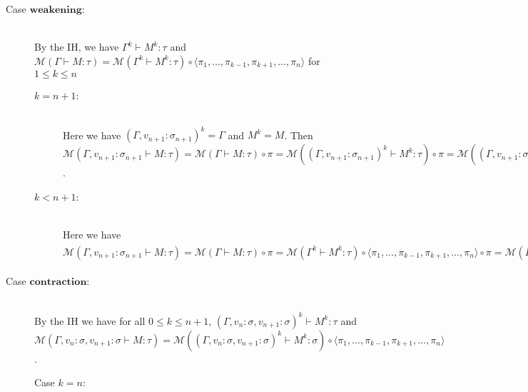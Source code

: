\documentclass{article}
\newcommand{\mbf}{\mathbf}
\begin{document}
\begin{description}
\item[Case $\mbf{weakening}$:]~\\

By the IH, we have $\Gamma^k \vdash M^k : \tau$ and 
$\mathcal M(\Gamma \vdash M : \tau) = \mathcal M(\Gamma^k \vdash M^k : \tau) \circ \langle \pi_1, \ldots, \pi_{k-1},\pi_{k+1},\ldots,\pi_n \rangle$ for $1 \leq k \leq n$

\begin{description}

\item[$k = n+1$:]~\\
Here we have $(\Gamma,v_{n+1}:\sigma_{n+1})^k = \Gamma$ and $M^k = M$.
Then $\mathcal M(\Gamma,v_{n+1} : \sigma_{n+1} \vdash M : \tau) = \mathcal M(\Gamma \vdash M : \tau) \circ \pi
= \mathcal M((\Gamma,v_{n+1}:\sigma_{n+1})^k \vdash M^k : \tau) \circ \pi 
= \mathcal M((\Gamma,v_{n+1}:\sigma_{n+1})^k \vdash M^k : \tau) \circ \langle \pi_1, \ldots, \pi_{k-1} (= \pi_{n}) \rangle$.

\item[$k < n+1$:]~\\
Here we have $\mathcal M(\Gamma,v_{n+1} : \sigma_{n+1} \vdash M : \tau) = \mathcal{M}(\Gamma \vdash M : \tau) \circ \pi
= \mathcal{M}(\Gamma^{k} \vdash M^{k} : \tau) \circ \langle \pi_1, \ldots, \pi_{k-1},\pi_{k+1},\ldots,\pi_n \rangle \circ \pi
= \mathcal{M}(\Gamma^{k} \vdash M^{k} : \tau) \circ \pi \circ \langle \pi_1, \ldots, \pi_{k-1},\pi_{k+1},\ldots,\pi_n,\pi_{n+1} \rangle = \mathcal M( (\Gamma, v_{n+1})^k \vdash M^k : \tau) \circ \langle \pi_1, \ldots, \pi_{k-1},\pi_{k+1},\ldots,\pi_n,\pi_{n+1} \rangle$ 

\end{description}

\item[Case $\mbf{contraction}$:]~\\

By the IH we have for all $0 \leq k \leq n + 1$, $(\Gamma,v_{n} : \sigma, v_{n+1} : \sigma)^k \vdash M^k : \tau$
and 
$\mathcal M(\Gamma,v_n:\sigma,v_{n+1}:\sigma \vdash M : \tau) 
= \mathcal M((\Gamma,v_n:\sigma,v_{n+1}:\sigma)^k \vdash M^k : \sigma) \circ \langle \pi_1, \ldots, \pi_{k-1},\pi_{k+1},\ldots,\pi_n \rangle$.



\begin{description}

\item[Case $k = n$:]~\\
 


\end{description}
\end{description}
\end{document}
